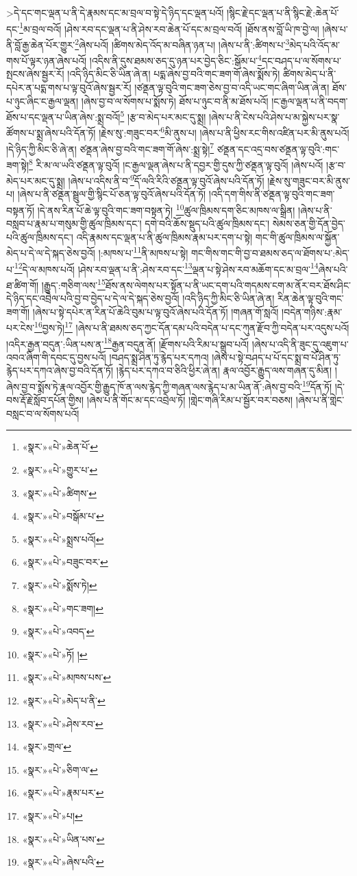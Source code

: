  >དེ་དང་གང་ལྡན་པ་ནི་དེ་རྣམས་དང་མ་བྲལ་བ་སྟེ་དེ་ཉིད་དང་ལྡན་པའོ། །སྙིང་རྗེ་དང་ལྡན་པ་ནི་སྙིང་རྗེ་:ཆེན་པོ་དང་\footnote{«སྣར་»«པེ་»ཆེན་པོ་}མ་བྲལ་བའོ། །ཤེས་རབ་དང་ལྡན་པ་ནི་ཤེས་རབ་ཆེན་པོ་དང་མ་བྲལ་བའོ། །ཐོས་ནས་བློ་ཡི་ཁ་བྱེ་ལ། །ཞེས་པ་ནི་བློ་རྒྱ་ཆེན་པོར་གྱུར་\footnote{«སྣར་»«པེ་»གྱུར་པ་}ཞེས་པའོ། །ཚིགས་མེད་འོད་མ་བཞིན་ཉན་པ། །ཞེས་པ་ནི་:ཚིགས་པ་\footnote{«སྣར་»«པེ་»ཚིགས་}མེད་པའི་འོད་མ་གས་པོ་ལྟར་ཉན་ཞེས་པའོ། །འདིས་ནི་དུས་ཐམས་ཅད་དུ་ཉན་པར་བྱེད་ཅིང་:སྒོམ་པ་\footnote{«སྣར་»«པེ་»བསྒོམ་པ་}དང་བཤད་པ་ལ་སོགས་པ་སྤངས་ཞེས་སྦྱར་རོ། །འདི་ཉིད་མིང་ཅི་ཡིན་ཞེ་ན། པདྨ་ཞེས་བྱ་བའི་གང་ཟག་གོ་ཞེས་སྨོས་ཏེ། ཚིགས་མེད་པ་ནི་དཔེར་ན་པདྨ་གས་པ་ལྟ་བུའོ་ཞེས་སྦྱར་རོ། །ཙནྡན་ལྟ་བུའི་གང་ཟག་ཅེས་བྱ་བ་འདི་ཡང་གང་ཞིག་ཡིན་ཞེ་ན། ཐོས་པ་ཉུང་ཞིང་ང་རྒྱལ་ལྡན། །ཞེས་བྱ་བ་ལ་སོགས་པ་སྨོས་ཏེ། ཐོས་པ་ཉུང་བ་ནི་མ་ཐོས་པའོ། །ང་རྒྱལ་ལྡན་པ་ནི་བདག་ཐོས་པ་དང་ལྡན་པ་ཡིན་ཞེས་:སྨྲ་བའོ།\footnote{«སྣར་»«པེ་»སྨྲས་པའོ།} །རྩ་བ་མེད་པར་མང་དུ་སྨྲ། །ཞེས་པ་ནི་ངེས་པའི་ཤེས་པ་མ་སྐྱེས་པར་སྣ་ཚོགས་པ་སྨྲ་ཞེས་པའི་དོན་ཏོ། །རྗེས་སུ་:གཟུང་བར་\footnote{«སྣར་»«པེ་»བཟུང་བར་}མི་ནུས་པ། །ཞེས་པ་ནི་ཕྱིས་རང་གིས་འཛིན་པར་མི་ནུས་པའོ། །དེ་ཉིད་ཀྱི་མིང་ཅི་ཞེ་ན། ཙནྡན་ཞེས་བྱ་བའི་གང་ཟག་གོ་ཞེས་:སྨྲ་སྟེ།\footnote{«སྣར་»«པེ་»སྨོས་ཏེ།} ཙནྡན་དང་འདྲ་བས་ཙནྡན་ལྟ་བུའི་:གང་ཟག་སྟེ།\footnote{«སྣར་»«པེ་»གང་ཟག།} རི་མ་ལ་ཡའི་ཙནྡན་ལྟ་བུའོ། །ང་རྒྱལ་ལྡན་ཞེས་པ་ནི་དབྱར་གྱི་དུས་ཀྱི་ཙནྡན་ལྟ་བུའོ། །ཞེས་པའོ། །རྩ་བ་མེད་པར་མང་དུ་སྨྲ། །ཞེས་པ་འདིས་ནི་བ་\footnote{«སྣར་»«པེ་»འབད་}དོ་ལའི་རིའི་ཙནྡན་ལྟ་བུའོ་ཞེས་པའི་དོན་ཏོ། །རྗེས་སུ་གཟུང་བར་མི་ནུས་པ། །ཞེས་པ་ནི་ཙནྡན་སྦྲུལ་གྱི་སྙིང་པོ་ཅན་ལྟ་བུའོ་ཞེས་པའི་དོན་ཏོ། །འདི་དག་གིས་ནི་ཙནྡན་ལྟ་བུའི་གང་ཟག་བསྟན་ཏོ། །དེ་ནས་རིན་པོ་ཆེ་ལྟ་བུའི་གང་ཟག་བསྟན་ཏེ། \footnote{«སྣར་»«པེ་»ཏོ། ། }ཚུལ་ཁྲིམས་དག་ཅིང་མཁས་ལ་སྒྲིན། །ཞེས་པ་ནི་བསླབ་པ་རྣམ་པ་གསུམ་གྱི་ཚུལ་ཁྲིམས་དང་། དགེ་བའི་ཆོས་སྡུད་པའི་ཚུལ་ཁྲིམས་དང་། སེམས་ཅན་གྱི་དོན་བྱེད་པའི་ཚུལ་ཁྲིམས་དང་། འདི་རྣམས་དང་ལྡན་པ་ནི་ཚུལ་ཁྲིམས་རྣམ་པར་དག་པ་སྟེ། གང་གི་ཚུལ་ཁྲིམས་ལ་སྐྱོན་མེད་པ་དེ་ལ་དེ་སྐད་ཅེས་བྱའོ། །:མཁས་པ་\footnote{«སྣར་»«པེ་»མཁས་པས་}ནི་མཁས་པ་སྟེ། གང་གིས་གང་གི་བྱ་བ་ཐམས་ཅད་ལ་ཐོགས་པ་:མེད་པ་\footnote{«སྣར་»«པེ་»མེད་པ་ནི་}དེ་ལ་མཁས་པའོ། །ཤེས་རབ་ལྡན་པ་ནི་:ཤེས་རབ་དང་\footnote{«སྣར་»«པེ་»ཤེས་རབ་}ལྡན་པ་སྟེ་ཤེས་རབ་མཆོག་དང་མ་བྲལ་\footnote{«སྣར་»གྲལ་}ཞེས་པའི་ཐ་ཚིག་གོ། །རྒྱུད་:གཅིག་ལས་\footnote{«སྣར་»«པེ་»ཅིག་ལ་}ཐོས་ནས་ལེགས་པར་སྟོན་པ་ནི་ཡང་དག་པའི་གདམས་ངག་མ་ནོར་བར་ཐོས་ཤིང་དེ་ཉིད་དང་འབྲེལ་པའི་བྱ་བ་བྱེད་པ་དེ་ལ་དེ་སྐད་ཅེས་བྱའོ། །འདི་ཉིད་ཀྱི་མིང་ཅི་ཡིན་ཞེ་ན། རིན་ཆེན་ལྟ་བུའི་གང་ཟག་གོ། །ཞེས་པ་སྟེ་དཔེར་ན་རིན་པོ་ཆེའི་བུམ་པ་ལྟ་བུའོ་ཞེས་པའི་དོན་ཏོ། །གཞན་གོ་སླའོ། །བདེན་གཉིས་:རྣམ་པར་ངེས་\footnote{«སྣར་»«པེ་»རྣམ་པར་}བྱས་ཏེ།\footnote{«སྣར་»«པེ་»པ།} །ཞེས་པ་ནི་ཐམས་ཅད་ཀྱང་དོན་དམ་པའི་བདེན་པ་དང་ཀུན་རྫོབ་ཀྱི་བདེན་པར་འདུས་པའོ། །འདིར་རྒྱན་བདུན་:ཡིན་པས་ན་\footnote{«སྣར་»«པེ་»ཡིན་པས་}རྒྱན་བདུན་ནོ། །རྫོགས་པའི་རིམ་པ་སྒྲུབ་པའོ། །ཞེས་པ་འདི་ནི་ཟུང་དུ་འཇུག་པ་འབའ་ཞིག་གི་དབང་དུ་བྱས་པའོ། །བཤད་སྨྲ་ཤིན་ཏུ་རྙེད་པར་དཀའ། །ཞེས་པ་སྟེ་བཤད་པ་པོ་དང་སྨྲ་བ་པོ་ཤིན་ཏུ་རྙེད་པར་དཀའ་ཞེས་བྱ་བའི་དོན་ཏོ། །རྙེད་པར་དཀའ་བ་ཅིའི་ཕྱིར་ཞེ་ན། རྣལ་འབྱོར་རྒྱུད་ལས་གཞན་དུ་མིན། །ཞེས་བྱ་བ་སྨོས་ཏེ་རྣལ་འབྱོར་གྱི་རྒྱུད་ཁོ་ན་ལས་རྙེད་ཀྱི་གཞན་ལས་རྙེད་པ་མ་ཡིན་ནོ་:ཞེས་བྱ་བའི་\footnote{«སྣར་»«པེ་»ཞེས་པའི་}དོན་ཏོ། །དེ་བས་རྡོ་རྗེ་སློབ་དཔོན་གྱིས། །ཞེས་པ་ནི་གོང་མ་དང་འབྲེལ་ཏོ། །གླེང་གཞི་རིམ་པ་སྦྱོར་བར་བཅས། །ཞེས་པ་ནི་གླེང་བསླང་བ་ལ་སོགས་པའོ། 